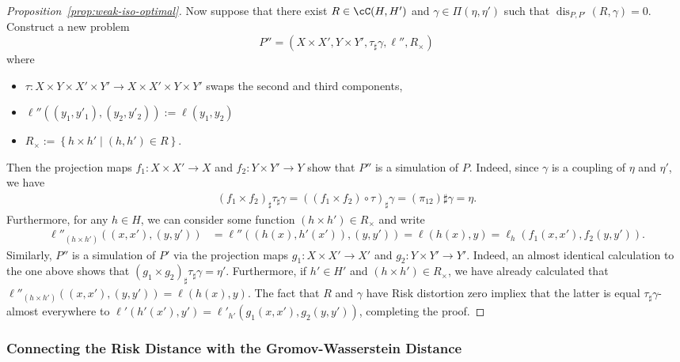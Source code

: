 \documentclass[twoside,11pt]{article}
\DeclareMathOperator{\dis}{dis}
\newcommand{\set}[2]{\left\{ #1\middle| #2\right\}}
\begin{document}
\begin{proof}[Proposition~\ref{prop:weak-iso-optimal}]
    Now suppose that there exist $R\in \cC(H,H')$ and $\gamma \in \Pi(\eta,\eta')$ such that $\dis_{P,P'}(R,\gamma)=0$. Construct a new problem
    \[P'' = (X\times X', Y\times Y', \tau_\sharp \gamma, \ell'', R_\times)\]
    where
    \begin{itemize}
        \item $\tau:X\times Y \times X' \times Y' \to X\times X' \times Y \times Y'$ swaps the second and third components,
        \item $\ell''((y_1,y'_1),(y_2,y'_2)) := \ell(y_1,y_2)$
        \item $R_\times := \set{h\times h'}{(h,h')\in R}$.
    \end{itemize}
    Then the projection maps $f_1:X\times X' \to X$ and $f_2:Y\times Y' \to Y$ show that $P''$ is a simulation of $P$. Indeed, since $\gamma$ is a coupling of $\eta$ and $\eta'$, we have
    \begin{align*}
        (f_1\times f_2)_\sharp \tau_\sharp \gamma = ((f_1\times f_2)\circ \tau)_\sharp \gamma = (\pi_{12})\sharp\gamma = \eta.
    \end{align*}
    Furthermore, for any $h\in H$, we can consider some function $(h\times h')\in R_\times$ and write
    \begin{align*}
        \ell''_{(h\times h')}((x,x'),(y,y'))
        & =
        \ell''((h(x),h'(x')),(y,y'))
        =
        \ell(h(x),y) = \ell_{h}(f_1(x,x'),f_2(y,y')).
    \end{align*}
    Similarly, $P''$ is a simulation of $P'$ via the projection maps $g_1:X\times X' \to X'$ and $g_2:Y\times Y' \to Y'$. Indeed, an almost identical calculation to the one above shows that $(g_1\times g_2)_\sharp \tau_\sharp \gamma = \eta'$. Furthermore, if $h'\in H'$ and $(h\times h')\in R_\times$, we have already calculated that $\ell''_{(h\times h')}((x,x'),(y,y')) = \ell(h(x),y)$.
    The fact that $R$ and $\gamma$ have Risk distortion zero impliex that the latter is equal $\tau_\sharp \gamma$-almost everywhere to $\ell'(h'(x'),y') = \ell'_{h'}(g_1(x,x'),g_2(y,y'))$, completing the proof.
\end{proof}
\subsubsection{Connecting the Risk Distance with the Gromov-Wasserstein Distance}\label{app:conn-dr-dgw}
\end{document}
